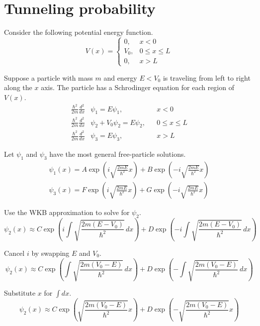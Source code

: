 

\section*{Tunneling probability}

Consider the following potential energy function.
\begin{equation*}
V(x)=\begin{cases}
0, & x<0
\\
V_0, & 0\le x\le L
\\
0, & x>L
\end{cases}
\end{equation*}

Suppose a particle with mass $m$ and energy $E<V_0$ is traveling from left to right
along the $x$ axis.
The particle has a Schrodinger equation for each region of $V(x)$.
\begin{align*}
\frac{\hbar^2}{2m}\frac{d^2}{dx}&\psi_1=E\psi_1, & &x<0
\\[1ex]
\frac{\hbar^2}{2m}\frac{d^2}{dx}&\psi_2+V_0\psi_2=E\psi_2, & &0\le x\le L
\\[1ex]
\frac{\hbar^2}{2m}\frac{d^2}{dx}&\psi_3=E\psi_3, & &x>L
\end{align*}

Let $\psi_1$ and $\psi_3$ have the most general
free-particle solutions.
\begin{align*}
\psi_1(x)=A\exp\left(i\sqrt{\frac{2mE}{\hbar^2}}x\right)
+B\exp\left(-i\sqrt{\frac{2mE}{\hbar^2}}x\right)
\\
\psi_3(x)=F\exp\left(i\sqrt{\frac{2mE}{\hbar^2}}x\right)
+G\exp\left(-i\sqrt{\frac{2mE}{\hbar^2}}x\right)
\end{align*}

Use the WKB approximation to solve for $\psi_2$.
\begin{equation*}
\psi_2(x)\approx
C\exp\left(i\int\sqrt{\frac{2m(E-V_0)}{\hbar^2}}\,dx\right)
+D\exp\left(-i\int\sqrt{\frac{2m(E-V_0)}{\hbar^2}}\,dx\right)
\end{equation*}

Cancel $i$ by swapping $E$ and $V_0$.
\begin{equation*}
\psi_2(x)\approx
C\exp\left(\int\sqrt{\frac{2m(V_0-E)}{\hbar^2}}\,dx\right)
+D\exp\left(-\int\sqrt{\frac{2m(V_0-E)}{\hbar^2}}\,dx\right)
\end{equation*}

Substitute $x$ for $\int dx$.
\begin{equation*}
\psi_2(x)\approx
C\exp\left(\sqrt{\frac{2m(V_0-E)}{\hbar^2}}x\right)
+D\exp\left(-\sqrt{\frac{2m(V_0-E)}{\hbar^2}}x\right)
\end{equation*}

